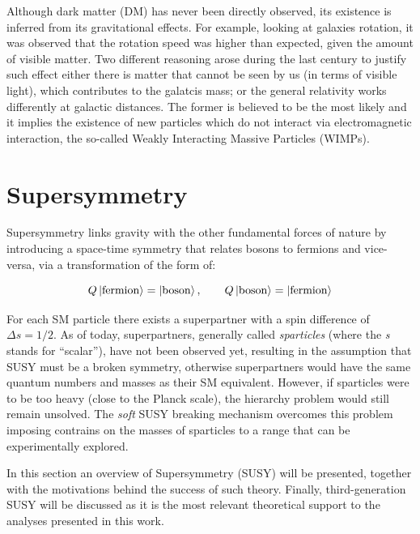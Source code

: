 			Although dark matter (DM) has never been directly observed, its existence is inferred from its gravitational effects. For example, looking at galaxies rotation, it was observed that the rotation speed was higher than expected, given the amount of visible matter. Two different reasoning arose during the last century to justify such effect either there is matter that cannot be seen by us (in terms of visible light), which contributes to the galatcis mass; or the general relativity works differently at galactic distances. The former is believed to be the most likely and it implies the existence of new particles which do not interact via electromagnetic interaction, the so-called Weakly Interacting Massive Particles (WIMPs).





	\section{Supersymmetry}
	\label{sec:SUSY}

		Supersymmetry links gravity with the other fundamental forces of nature by introducing a space-time symmetry that relates bosons to fermions and vice-versa, via a transformation of the form of:  

		\begin{equation}
		\label{eq:susy_transformation}
			Q \ket{\mathrm{fermion}} = \ket{\mathrm{boson}}, \qquad Q \ket{\mathrm{boson}} = \ket{\mathrm{fermion}}
		\end{equation}

		\noindent For each SM particle there exists a superpartner with a spin difference of $\Delta s = 1/2$. As of today, superpartners, generally called \emph{sparticles} (where the \emph{s} stands for ``scalar''), have not been observed yet, resulting in the assumption that SUSY must be a broken symmetry, otherwise superpartners would have the same quantum numbers and masses as their SM equivalent. However, if sparticles were to be too heavy (close to the Planck scale), the hierarchy problem would still remain unsolved. The \emph{soft} SUSY breaking mechanism overcomes this problem imposing contrains on the masses of sparticles to a range that can be experimentally explored. 

		In this section an overview of Supersymmetry (SUSY) will be presented, together with the motivations behind the success of such theory. Finally, third-generation SUSY will be discussed as it is the most relevant theoretical support to the analyses presented in this work. 
		
